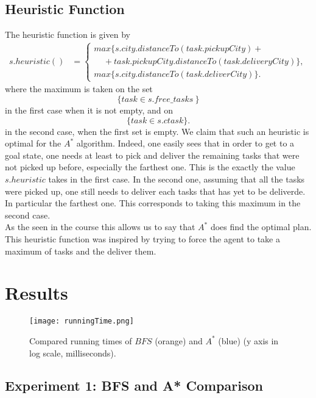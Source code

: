 \documentclass[11pt]{article}
\begin{document}
\subsection{Heuristic Function}
The heuristic function is given by 
	\begin{align*}
		s.heuristic() & = \begin{cases}	
							max \{s.city.distanceTo(task.pickupCity)+\\ \ \ \ \ \ +task.pickupCity.distanceTo(task.deliveryCity)\},\\
							max  \{s.city.distanceTo(task.deliverCity)\}.
						\end{cases}
	\end{align*}
where the maximum is taken on the set $$\{task\in s.free\_tasks\ \}$$ in the first case when it is not empty, and on $$\{task\in s.ctask\}.$$ in the second case, when the first set is empty. We claim that such an heuristic is optimal for the $A^*$ algorithm. Indeed, one easily sees that in order to get to a goal state, one needs at least to pick and deliver the remaining tasks that were not picked up before, especially the farthest one. This is the exactly the value $s.heuristic$ takes in the first case. In the second one, assuming that all the tasks were picked up, one still needs to deliver each tasks that has yet to be deliverde. In particular the farthest one. This corresponds to taking this maximum in the second case. \\
As the seen in the course this allows us to say that $A^*$ does find the optimal plan. This heuristic function was inspired by trying to force the agent to take a maximum of tasks and the deliver them.

\section{Results}

\begin{figure}[h!]
	\centering
	\texttt{[image: runningTime.png]}
	\caption{Compared running times of $BFS$ (orange) and $A^*$ (blue) (y axis in log scale, milliseconds).}
  \end{figure}

\subsection{Experiment 1: BFS and A* Comparison}
\end{document}
